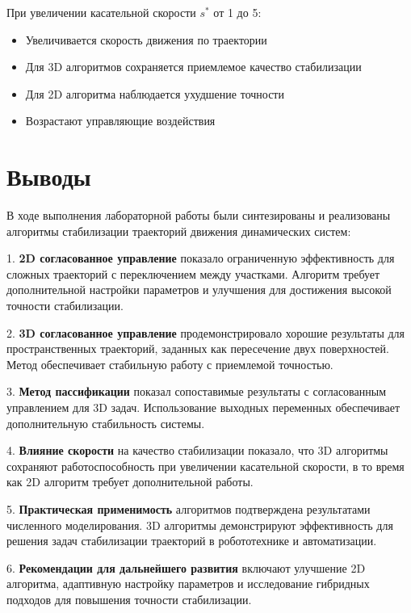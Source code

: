При увеличении касательной скорости $s^*$ от 1 до 5:
\begin{itemize}
\item Увеличивается скорость движения по траектории
\item Для 3D алгоритмов сохраняется приемлемое качество стабилизации
\item Для 2D алгоритма наблюдается ухудшение точности
\item Возрастают управляющие воздействия
\end{itemize}

\section{Выводы}

В ходе выполнения лабораторной работы были синтезированы и реализованы алгоритмы стабилизации траекторий движения динамических систем:

1. \textbf{2D согласованное управление} показало ограниченную эффективность для сложных траекторий с переключением между участками. Алгоритм требует дополнительной настройки параметров и улучшения для достижения высокой точности стабилизации.

2. \textbf{3D согласованное управление} продемонстрировало хорошие результаты для пространственных траекторий, заданных как пересечение двух поверхностей. Метод обеспечивает стабильную работу с приемлемой точностью.

3. \textbf{Метод пассификации} показал сопоставимые результаты с согласованным управлением для 3D задач. Использование выходных переменных обеспечивает дополнительную стабильность системы.

4. \textbf{Влияние скорости} на качество стабилизации показало, что 3D алгоритмы сохраняют работоспособность при увеличении касательной скорости, в то время как 2D алгоритм требует дополнительной работы.

5. \textbf{Практическая применимость} алгоритмов подтверждена результатами численного моделирования. 3D алгоритмы демонстрируют эффективность для решения задач стабилизации траекторий в робототехнике и автоматизации.

6. \textbf{Рекомендации для дальнейшего развития} включают улучшение 2D алгоритма, адаптивную настройку параметров и исследование гибридных подходов для повышения точности стабилизации.

